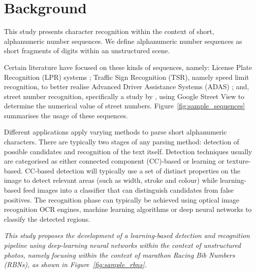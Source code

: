 \section{Background}

This study presents character recognition within the context of short, alphanumeric number sequences. We define alphanumeric number sequences as short fragments of digits within an unstructured scene.   

Certain literature have focused on these kinds of sequences, namely: License Plate Recognition (LPR) systems \citep{CanoPerez:2003fq,Anagnostopoulos:2006wv}; Traffic Sign Recognition (TSR), namely speed limit recognition, to better realise Advanced Driver Assistance Systems (ADAS) \citep{Eichner:2008dw,Kundu:2015vq,Seo:2015ez,Lian:2016dc}; and, street number recognition, specifically a study by \citet{Netzer:2011to}, using Google Street View to determine the numerical value of street numbers. Figure~\ref{fig:sample_sequences} summarises the usage of these sequences.

Different applications apply varying methods to parse short alphanumeric characters. There are typically two stages of any parsing method: detection of possible candidates and recognition of the text itself. Detection techniques usually are categorised as either connected component (CC)-based or learning or texture-based. CC-based detection will typically use a set of distinct properties on the image to detect relevant areas (such as width, stroke and colour) while learning-based feed images into a classifier that can distinguish candidates from false positives. The recognition phase can typically be achieved using optical image recognition OCR engines, machine learning algorithms or deep neural networks to classify the detected regions.

{
  \itshape
  This study proposes the development of a learning-based detection and recognition pipeline using deep-learning neural networks within the context of unstructured photos, namely focusing within the context of marathon Racing Bib Numbers (RBNs), as shown in Figure~\ref{fig:sample_rbns}.
}

